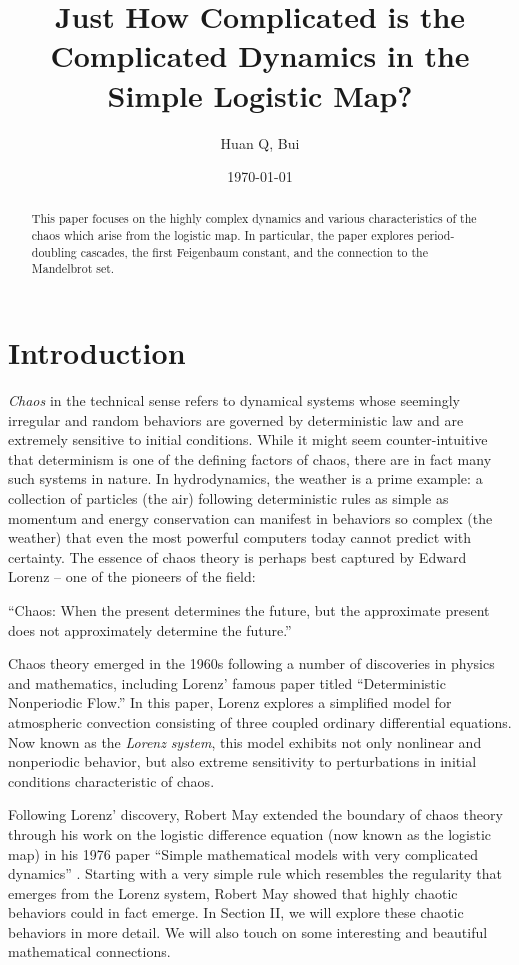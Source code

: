 \documentclass[twocolumn,amsmath,amssymb,aps]{revtex4}
\begin{document}
\title{Just How Complicated is the Complicated Dynamics in the Simple Logistic Map?}%
\author{Huan Q, Bui}
\date{\today}
\begin{abstract}
This paper focuses on the highly complex dynamics and various characteristics of the chaos which arise from the logistic map. In particular, the paper explores period-doubling cascades, the first Feigenbaum constant, and the connection to the Mandelbrot set.
\end{abstract}
\maketitle




\section{Introduction}
\textit{Chaos} in the technical sense refers to dynamical systems whose seemingly irregular and random behaviors are governed by deterministic law and are extremely sensitive to initial conditions. While it might seem counter-intuitive that determinism is one of the defining factors of chaos, there are in fact many such systems in nature. In hydrodynamics, the weather is a prime example: a collection of particles (the air) following deterministic rules as simple as momentum and energy conservation can manifest in behaviors so complex (the weather) that even the most powerful computers today cannot predict with certainty. The essence of chaos theory is perhaps best captured by Edward Lorenz -- one of the pioneers of the field:
\begin{displayquote}
``Chaos: When the present determines the future, but the approximate present does not approximately determine the future.''\cite{lorenz_quote}
\end{displayquote}
Chaos theory emerged in the 1960s following a number of discoveries in physics and mathematics, including Lorenz' famous paper titled ``Deterministic Nonperiodic Flow.'' In this paper, Lorenz explores a simplified  model for atmospheric convection consisting of three coupled ordinary differential equations. Now known as the \textit{Lorenz} \textit{system}, this model exhibits not only nonlinear and nonperiodic behavior, but also extreme sensitivity to perturbations in initial conditions characteristic of chaos.


Following Lorenz' discovery, Robert May extended the boundary of chaos theory through his work on the logistic difference equation (now known as the logistic map) in his 1976 paper ``{Simple mathematical models with very complicated dynamics}'' \cite{rmay76}. Starting with a very simple rule which resembles the regularity that emerges from the Lorenz system, Robert May showed that highly chaotic behaviors could in fact emerge. In Section II, we will explore these chaotic behaviors in more detail. We will also touch on some interesting and beautiful mathematical connections.
\end{document}

